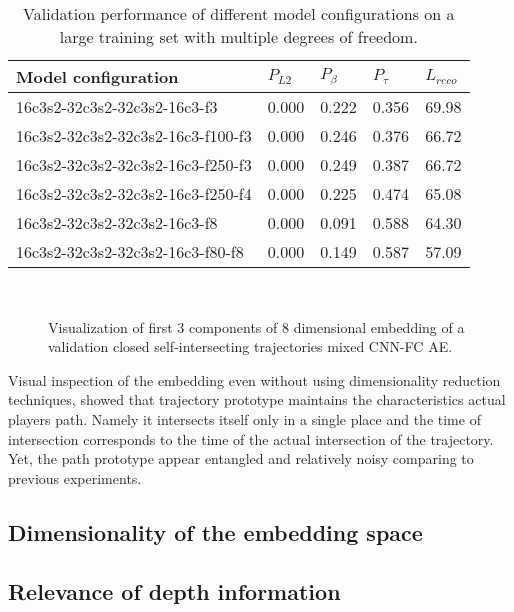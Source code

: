 \begin{table}
\begin{center}
    \begin{tabular}{| l | l | l | l | l |}
      \hline
     Model configuration  &  $P_{L2}$ & $P_{\beta}$ & $P_{\tau}$ & $L_{reco}$ \\ \hline
     16c3s2-32c3s2-32c3s2-16c3-f3     & 0.000 & 0.222 & 0.356 & 69.98 \\
     16c3s2-32c3s2-32c3s2-16c3-f100-f3 & 0.000 & 0.246 & 0.376 & 66.72 \\
     16c3s2-32c3s2-32c3s2-16c3-f250-f3 & 0.000 & 0.249 & 0.387 & 66.72 \\
     16c3s2-32c3s2-32c3s2-16c3-f250-f4 & 0.000 & 0.225 & 0.474 & 65.08 \\
     16c3s2-32c3s2-32c3s2-16c3-f8      & 0.000 & 0.091 & 0.588 & 64.30 \\
     16c3s2-32c3s2-32c3s2-16c3-f80-f8  & 0.000 & 0.149 & 0.587 & 57.09 \\ \hline
    \end{tabular}
\end{center}
  \caption{Validation performance of different model configurations on a large training set with multiple degrees of freedom.}
  \label{tab:large}
\end{table}

\begin{figure}[t!]
	\centering
	\\
    	\caption{Visualization of first 3 components of 8 dimensional embedding of a validation closed self-intersecting trajectories mixed CNN-FC AE.}
    	\label{fig:model_big}
\end{figure}

Visual inspection of the embedding even without using dimensionality reduction techniques, showed that trajectory prototype maintains the characteristics actual players path. Namely it intersects itself only in a single place and the time of intersection corresponds to the time of the actual intersection of the trajectory. Yet, the path prototype appear entangled and relatively noisy comparing to previous experiments.




\subsection{Dimensionality of the embedding space}


\subsection{Relevance of depth information}
